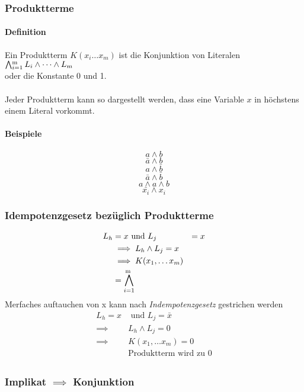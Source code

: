 \documentclass[a4paper]{scrartcl}
\begin{document}
			\subsubsection{Produktterme}
			\paragraph{Definition}
			Ein Produktterm \( K(x_i \dots x_m) \) ist die Konjunktion von Literalen \( \bigwedge^{\raisebox{-0.4ex}{\scriptsize m } }_{i = 1} L_i \wedge \dots \wedge L_m \)\\
			oder die Konstante 0 und 1.\\
			\\
			Jeder Produktterm kann so dargestellt werden, dass eine Variable \( x \) in höchstens einem Literal vorkommt.
			\paragraph{Beispiele}
			\[ a \wedge b \]
			\[ \bar{a} \wedge b \]
			\[ a \wedge \bar{b}  \]
			\[ \bar{a} \wedge \bar{b}  \]
			\[ a \wedge a \wedge b  \]
			\[ \bar{x_i} \wedge x_i \]
			
			\subsubsection{Idempotenzgesetz bezüglich Produktterme}
			\begin{align*}
				L_h &= x \text{ und } L_j &= x\\
				&\implies L_h \wedge L_j = x\\
				&\implies K(x_1, \dots x_m) \\
				&= \bigwedge^{\raisebox{-0.4ex}{\scriptsize m } }_{i = 1}\\
			\end{align*}
			Merfaches auftauchen von x kann nach \emph{Indempotenzgesetz} gestrichen werden\\
			
			\begin{align*}
			L_h = x &\text{ und } L_j = \bar{x}\\
			\implies & L_h \wedge L_j = 0 \\
			\implies & K(x_1, \dots x_m) = 0\\
			& \text{Produktterm wird zu 0}\\	
			\end{align*}
			
			\subsubsection{Implikat \( \implies \) Konjunktion }
\end{document}

